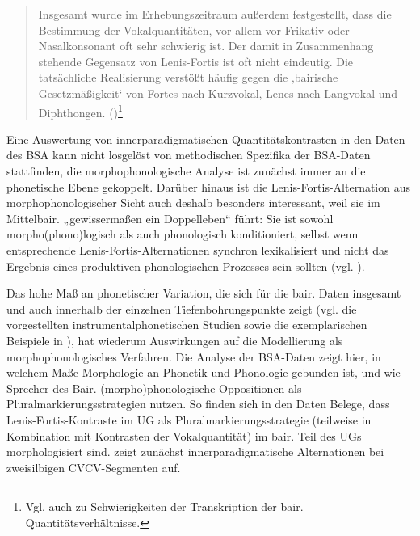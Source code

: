 \begin{quote}
Insgesamt wurde im Erhebungszeitraum außerdem festgestellt, dass die Bestimmung der Vokalquantitäten, vor allem vor Frikativ oder Nasalkonsonant oft sehr schwierig ist. Der damit in Zusammenhang stehende Gegensatz von Lenis-Fortis ist oft nicht eindeutig. Die tatsächliche Realisierung verstößt häufig gegen die ‚bairische Gesetzmäßigkeit‘ von Fortes nach Kurzvokal, Lenes nach Langvokal und Diphthongen. (\citealt[23]{SNiB1})\footnote{Vgl. auch \citet[405--406]{Götz1987} zu Schwierigkeiten der Transkription der bair. Quantitätsverhältnisse.}
\end{quote}

Eine Auswertung von innerparadigmatischen Quantitätskontrasten in den Daten des BSA kann nicht losgelöst von methodischen Spezifika der BSA-Daten stattfinden, die morphophonologische Analyse ist zunächst immer an die phonetische Ebene gekoppelt. Darüber hinaus ist die Lenis-Fortis-Alternation aus morphophonologischer Sicht auch deshalb besonders interessant, weil sie im Mittelbair. „gewissermaßen ein Doppelleben“ \citep[191]{Seiler2008} führt: Sie ist sowohl morpho(phono)logisch als auch phonologisch konditioniert, selbst wenn entsprechende Lenis-Fortis-Alternationen synchron lexikalisiert und nicht das Ergebnis eines produktiven phonologischen Prozesses sein sollten (vgl. \citealt[19]{Scheutz1984}).



Das hohe Maß an phonetischer Variation, die sich für die bair. Daten insgesamt und auch innerhalb der einzelnen Tiefenbohrungspunkte zeigt (vgl. die vorgestellten instrumentalphonetischen Studien sowie die exemplarischen Beispiele in 	), hat wiederum Auswirkungen auf die Modellierung als morphophonologisches Verfahren. Die Analyse der BSA-Daten zeigt hier, in welchem Maße Morphologie an Phonetik und Phonologie gebunden ist, und wie Sprecher des Bair. (morpho)phonologische Oppositionen als Pluralmarkierungsstrategien nutzen. So finden sich in den Daten Belege, dass Lenis-Fortis-Kontraste im UG als Pluralmarkierungsstrategie (teilweise in Kombination mit Kontrasten der Vokalquantität) im bair. Teil des UGs morphologisiert sind.  zeigt zunächst innerparadigmatische Alternationen bei zweisilbigen CVCV-Segmenten auf.


